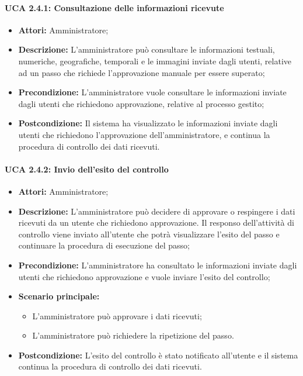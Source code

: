 \paragraph{UCA 2.4.1: Consultazione delle informazioni ricevute}
\begin{itemize}
\item \textbf{Attori:}
 Amministratore;
\item \textbf{Descrizione:} 
L'amministratore può consultare le informazioni testuali, numeriche, geografiche, temporali e le immagini inviate dagli utenti, relative ad un passo che richiede l'approvazione manuale per essere superato; 
\item \textbf{Precondizione:} 
L'amministratore vuole consultare le informazioni inviate dagli utenti che richiedono approvazione, relative al processo gestito;
\item \textbf{Postcondizione:} 
Il sistema ha visualizzato le informazioni inviate dagli utenti che richiedono l'approvazione dell'amministratore, e continua la procedura di controllo dei dati ricevuti.
\end{itemize}

\paragraph{UCA 2.4.2: Invio dell'esito del controllo}
\begin{itemize}
\item \textbf{Attori:}
 Amministratore;
\item \textbf{Descrizione:} 
L'amministratore può decidere di approvare o respingere i dati ricevuti da un utente che richiedono approvazione.
Il responso dell'attività di controllo viene inviato all'utente che potrà visualizzare l'esito del passo e continuare la procedura di esecuzione del passo;
\item \textbf{Precondizione:} 
L'amministratore ha consultato le informazioni inviate dagli utenti che richiedono approvazione e vuole inviare l'esito del controllo;
\item \textbf{Scenario principale:} 
\begin{itemize}
\item L'amministratore può approvare i dati ricevuti;
\item L'amministratore può richiedere la ripetizione del passo.
\end{itemize}
\item \textbf{Postcondizione:} 
L'esito del controllo è stato notificato all'utente e il sistema continua la procedura di controllo dei dati ricevuti.
\end{itemize}

